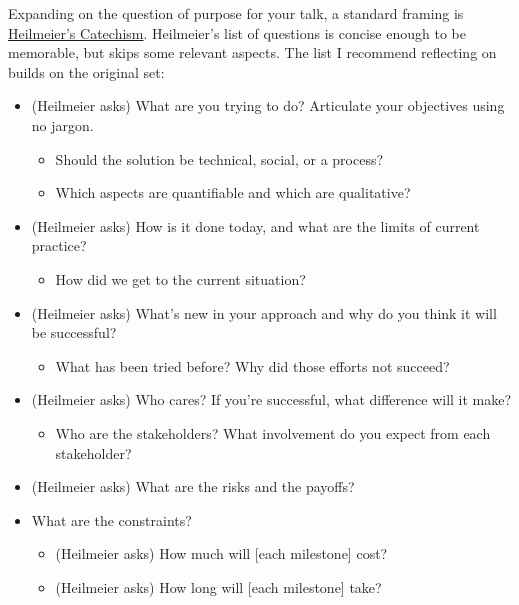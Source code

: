 \label{sec:extending-Heilmeier}
Expanding on the question of purpose for your talk, a standard framing is 
\href{https://en.wikipedia.org/wiki/George_H._Heilmeier\%23Heilmeier's_Catechism}{Heilmeier's Catechism}.
Heilmeier's list of questions is concise enough to be memorable, but skips some relevant aspects. The list I recommend reflecting on builds on the original set:
\begin{itemize}
    \item (Heilmeier asks) What are you trying to do? Articulate your objectives using  no jargon.
    \begin{itemize}
        \item Should the solution be technical, social, or a process?
        \item Which aspects are quantifiable and which are qualitative?
    \end{itemize}
    \item (Heilmeier asks) How is it done today, and what are the limits of current practice?
    \begin{itemize}
        \item How did we get to the current situation? 
    \end{itemize}
    \item (Heilmeier asks) What's new in your approach and why do you think it will be successful?
    \begin{itemize}
        \item What has been tried before? Why did those efforts not succeed?
    \end{itemize}
    \item (Heilmeier asks) Who cares? If you're successful, what difference will it make?
    \begin{itemize}
        \item Who are the stakeholders? What involvement do you expect from each stakeholder?
    \end{itemize}
    \item (Heilmeier asks) What are the risks and the payoffs?
    \item What are the constraints?
    \begin{itemize}
        \item (Heilmeier asks) How much will [each milestone] cost?
        \item (Heilmeier asks) How long will [each milestone] take?

\end{itemize}
\end{itemize}
